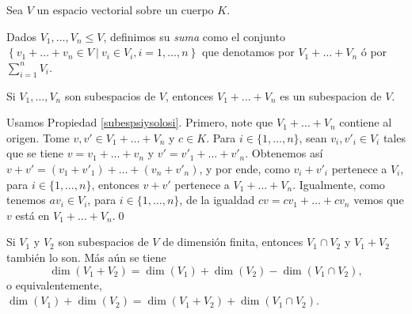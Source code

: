 Sea $V$ un espacio vectorial sobre un cuerpo $K$.

\begin{defn}
Dados $V_1,\ldots,V_n\le V$, definimos su \emph{suma} como el conjunto $\left\{v_1+\ldots+v_n\in V\ |\ v_i\in V_i, i=1,\ldots,n \right\}$ que denotamos por $V_1+\ldots+V_n$ \'o por $\sum_{i=1}^n V_i$.
\end{defn}

\begin{prop}
Si $V_1,\ldots,V_n$ son subespacios de $V$, entonces $V_1+\ldots+V_n$ es un subespacion de $V$.
\end{prop}

\dem Usamos Propiedad \ref{subespsiysolosi}. Primero, note que $V_1+\ldots+V_n$ contiene al origen. Tome $v,v'\in  V_1+\ldots+V_n$ y $c\in K$. Para $i\in\{1,\ldots,n\}$, sean $v_i,v'_i\in V_i$ tales que se tiene $v=v_1+\ldots+v_n$ y $v'=v'_1+\ldots+v'_n$. Obtenemos as\'i $v+v'=(v_1+v'_1)+\ldots+(v_n+v'_n)$, y por ende, como $v_i+v'_i$ pertenece a $V_i$, para $i\in\{1,\ldots,n\}$, entonces $v+v'$ pertenece a $V_1+\ldots+V_n$. Igualmente, como tenemos $av_i\in V_i$, para $i\in\{1,\ldots,n\}$, de la igualdad $cv=cv_1+\ldots+cv_n$ vemos que $ v$ est\'a en $V_1+\ldots+V_n$.\qed

\begin{teo}\label{sumaint}
Si $V_1$ y $V_2$ son subespacios de $V$ de dimensi\'on finita, entonces $V_1\cap V_2$ y $V_1+V_2$ tambi\'en lo son. M\'as a\'un se tiene
\[
\dim(V_1+V_2)=\dim(V_1)+\dim(V_2)-\dim(V_1\cap V_2),
\]
o equivalentemente, $\dim(V_1)+\dim(V_2)=\dim(V_1+V_2)+\dim(V_1\cap V_2)$.
\end{teo}

